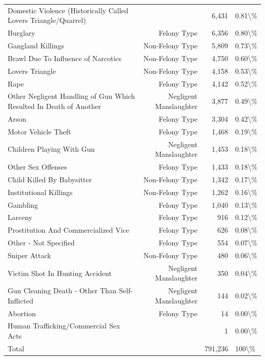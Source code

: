 \documentclass[
  12pt,
  openany]{book}
\begin{document}
\begin{longtable}[t]{lrrl}
Domestic Violence (Historically Called Lovers Triangle/Quarrel) &  & 6,431 & 0.81\textbackslash{}\%\\
Burglary & Felony Type & 6,356 & 0.80\textbackslash{}\%\\
\addlinespace
Gangland Killings & Non-Felony Type & 5,809 & 0.73\textbackslash{}\%\\
Brawl Due To Influence of Narcotics & Non-Felony Type & 4,750 & 0.60\textbackslash{}\%\\
Lovers Triangle & Non-Felony Type & 4,158 & 0.53\textbackslash{}\%\\
Rape & Felony Type & 4,142 & 0.52\textbackslash{}\%\\
Other Negligent Handling of Gun Which Resulted In Death of Another & Negligent Manslaughter & 3,877 & 0.49\textbackslash{}\%\\
\addlinespace
Arson & Felony Type & 3,304 & 0.42\textbackslash{}\%\\
Motor Vehicle Theft & Felony Type & 1,468 & 0.19\textbackslash{}\%\\
Children Playing With Gun & Negligent Manslaughter & 1,453 & 0.18\textbackslash{}\%\\
Other Sex Offenses & Felony Type & 1,433 & 0.18\textbackslash{}\%\\
Child Killed By Babysitter & Non-Felony Type & 1,342 & 0.17\textbackslash{}\%\\
\addlinespace
Institutional Killings & Non-Felony Type & 1,262 & 0.16\textbackslash{}\%\\
Gambling & Felony Type & 1,040 & 0.13\textbackslash{}\%\\
Larceny & Felony Type & 916 & 0.12\textbackslash{}\%\\
Prostitution And Commercialized Vice & Felony Type & 626 & 0.08\textbackslash{}\%\\
Other - Not Specified & Felony Type & 554 & 0.07\textbackslash{}\%\\
\addlinespace
Sniper Attack & Non-Felony Type & 480 & 0.06\textbackslash{}\%\\
Victim Shot In Hunting Accident & Negligent Manslaughter & 350 & 0.04\textbackslash{}\%\\
Gun Cleaning Death - Other Than Self-Inflicted & Negligent Manslaughter & 144 & 0.02\textbackslash{}\%\\
Abortion & Felony Type & 14 & 0.00\textbackslash{}\%\\
Human Trafficking/Commercial Sex Acts &  & 1 & 0.00\textbackslash{}\%\\
\addlinespace
Total &  & 791,236 & 100\textbackslash{}\%\\
\bottomrule
\end{longtable}
\end{document}
